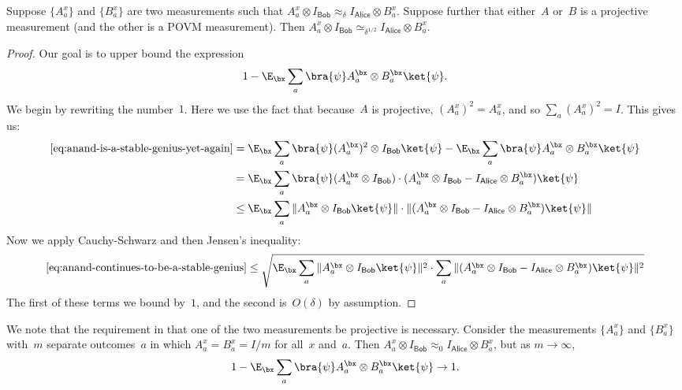 \documentclass[11pt]{article}
\newcommand{\consistency}{\simeq}
\newcommand{\reg}[1]{{\mathsf{#1}}}
\begin{document}
\begin{fact}\label{fact:almost-agreement}
Suppose $\{A^x_a\}$ and $\{B^x_a\}$ are two measurements such that $A^x_a \otimes I_{\reg{Bob}} \approx_{\delta} I_{\reg{Alice}} \otimes B^x_a$.
Suppose further that either~$A$ or~$B$ is a projective measurement (and the other is a POVM measurement).
Then $A^x_a \otimes I_{\reg{Bob}} \consistency_{\delta^{1/2}} I_{\reg{Alice}} \otimes B^x_a$.
\end{fact}
\begin{proof}
Our goal is to upper bound the expression
\begin{equation}\label{eq:anand-is-a-stable-genius-yet-again}
1 - \E_\bx \sum_a \bra{\psi} A^{\bx}_a \otimes B^{\bx}_a \ket{\psi}.
\end{equation}
We begin by rewriting the number~$1$.
Here we use the fact that because~$A$ is projective, $(A^x_a)^2 = A^x_a$,
and so $\sum_a (A^x_a)^2 = I$.
This gives us:
\begin{align}
\eqref{eq:anand-is-a-stable-genius-yet-again}
& = \E_\bx \sum_a \bra{\psi} (A^{\bx}_a)^2 \otimes I_{\reg{Bob}} \ket{\psi} - \E_\bx \sum_a \bra{\psi} A^{\bx}_a \otimes B^{\bx}_a \ket{\psi}\nonumber\\
& = \E_\bx \sum_a \bra{\psi} (A^{\bx}_a \otimes I_{\reg{Bob}}) \cdot (A^{\bx}_a \otimes I_{\reg{Bob}} - I_{\reg{Alice}} \otimes B^{\bx}_a) \ket{\psi}\nonumber\\
& \leq \E_\bx \sum_a \Vert A^{\bx}_a \otimes I_{\reg{Bob}} \ket{\psi}\Vert \cdot \Vert(A^{\bx}_a \otimes I_{\reg{Bob}} - I_{\reg{Alice}} \otimes B^{\bx}_a) \ket{\psi}\Vert\label{eq:anand-continues-to-be-a-stable-genius}
\end{align}
Now we apply Cauchy-Schwarz and then Jensen's inequality:
\begin{equation*}
\eqref{eq:anand-continues-to-be-a-stable-genius}
\leq  \sqrt{\E_\bx \sum_a \Vert A^{\bx}_a \otimes I_{\reg{Bob}} \ket{\psi}\Vert^2
	\cdot \sum_a \Vert(A^{\bx}_a \otimes I_{\reg{Bob}} - I_{\reg{Alice}} \otimes B^{\bx}_a) \ket{\psi}\Vert^2}
\end{equation*}
The first of these terms we bound by~$1$, and the second is~$O(\delta)$ by assumption.
\end{proof}

\begin{remark}\label{remark:fraction-of-identity}
We note that the requirement in 
that one of the two measurements be projective is necessary.
Consider the measurements $\{A^x_a\}$ and $\{B^x_a\}$ with~$m$ separate outcomes~$a$
in which $A^x_a = B^x_a = I/m$ for all~$x$ and~$a$. Then $A^x_a \otimes I_{\reg{Bob}} \approx_{0} I_{\reg{Alice}} \otimes B^x_a$, but as $m \rightarrow \infty$,
\begin{equation*}
1- \E_\bx \sum_a \bra{\psi} A^{\bx}_a \otimes B^{\bx}_a \ket{\psi} \rightarrow 1.
\end{equation*}
\end{remark}
\end{document}
